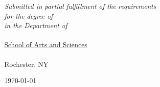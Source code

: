 \documentclass[
11pt, %
english, %
doublespacing, %
nolistspacing, %
headsepline, %
]{MastersDoctoralThesis} %
\begin{document}
\begin{titlepage}
\begin{singlespace}
\begin{center}
\vfill

\large \textit{Submitted in partial fulfillment of the requirements\\ for the degree of \degreename}\\[0.3cm] %
\textit{in the Department of}\\[0.4cm]
\deptname\\{\href{https://www.sas.rochester.edu/}{School of Arts and Sciences}}\\\univname\\{Rochester, NY} %
 
\vfill

{\large \today}\\[4cm] %

 
\vfill
\end{center}
\end{singlespace}
\end{titlepage}






{
\hypersetup{hidelinks}
\tableofcontents %
}





\end{document}
